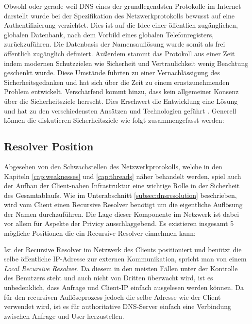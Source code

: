 Obwohl oder gerade weil DNS eines der grundlegendsten Protokolle im Internet darstellt wurde bei der Spezifikation des Netzwerkprotokolls bewusst auf eine Authentifizierung verzichtet. Dies ist auf die Idee einer öffentlich zugänglichen, globalen Datenbank, nach dem Vorbild eines globalen Telefonregisters, zurückzuführen. Die Datenbasis der Namensauflösung wurde somit als frei öffentlich zugänglich definiert. Außerdem stammt das Protokoll aus einer Zeit indem modernen Schutzzielen wie Sicherheit und Vertraulichkeit wenig Beachtung geschenkt wurde. Diese Umstände führten zu einer Vernachlässigung des Sicherheitsgedanken und hat sich über die Zeit zu einem ernstzunehmenden Problem entwickelt. Verschärfend kommt hinzu, dass kein allgemeiner Konsenz über die Sicherheitsziele herrscht. Dies Erschwert die Entwicklung eine Lösung und hat zu den verschiedensten Ansätzen und Technologien geführt \cite{Grothoff2018}. Generell können die diskutieren Sicherheitsziele wie folgt zusammengefasst werden:

\subsection{Resolver Position}
Abgesehen von den Schwachstellen des Netzwerkprotokolls, welche in den Kapiteln \ref{cap:weaknesses} und \ref{cap:threads} näher behandelt werden, spiel auch der Aufbau der Client-nahen Infrastruktur eine wichtige Rolle in der Sicherheit des Gesamtablaufs. Wie im Unterabschnitt \ref{subsec:dnsresolution} beschrieben, wird vom Client einen Recursive Resolver benötigt um die eigentliche Auflösung der Namen durchzuführen. Die Lage dieser Komponente im Netzwerk ist dabei vor allem für Aspekte der Privicy ausschlaggebend. Es existieren insgesamt 5 mögliche Positionen die ein Recursive Resolver einnehmen kann:

Ist der Recursive Resolver im Netzwerk des Clients positioniert und benützt die selbe öffentliche IP-Adresse zur externen Kommunikation, spricht man von einem \textit{Local Recursive Resolver}. Da diesem in den meisten Fällen unter der Kontrolle des Benutzers steht und auch nicht von Dritten überwacht wird, ist es unbedenklich, dass Anfrage und Client-IP einfach ausgelesen werden können. Da für den recursiven Auflöseprozess jedoch die selbe Adresse wie der Client verwendet wird, ist es für authoritative DNS-Server einfach eine Verbindung zwischen Anfrage und User herzustellen.  


